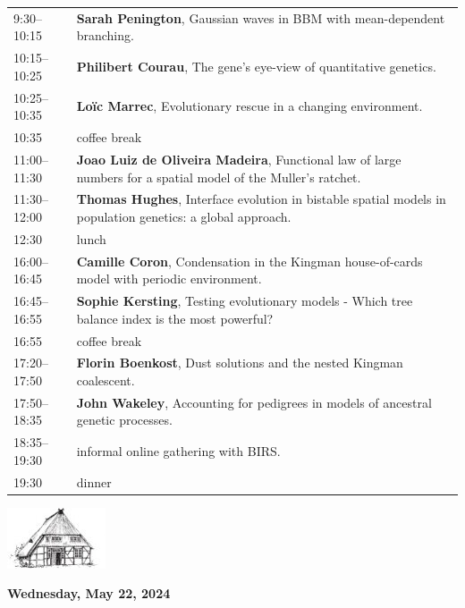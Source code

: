 \documentclass[12pt,a4paper]{article}
\newcommand{\Kopf}{%
\begin{center}%
\includegraphics[width=.2\textwidth]{logo-tsh}\\[2ex]
\end{center}
}
\begin{document}
\begin{tabular}{@{}l p{}@{}}
%
9:30--10:15 &  \textbf{Sarah Penington}, 
                Gaussian waves in BBM with mean-dependent branching. \\ 
10:15--10:25 & \textbf{Philibert Courau}, 
                The gene's eye-view of quantitative genetics. \\          
10:25--10:35 &  \textbf{Loïc Marrec},
                Evolutionary rescue in a changing environment. \\ 
10:35 & coffee break  \\  
11:00--11:30 &  \textbf{Joao Luiz de Oliveira Madeira}, 
                Functional law of large numbers for a spatial model of the Muller's ratchet. \\
11:30--12:00 &  \textbf{Thomas Hughes}, 
                Interface evolution in bistable spatial models in population genetics: a global approach.\\
12:30 & lunch  \\  
16:00--16:45 & \textbf{Camille Coron}, 
                Condensation in the Kingman house-of-cards model with periodic environment.\\ 
16:45--16:55 & \textbf{Sophie Kersting},
                Testing evolutionary models - Which tree balance index is the most powerful? \\
16:55 & coffee break  \\ 
17:20--17:50 & \textbf{Florin Boenkost}, 
                Dust solutions and the nested Kingman coalescent. \\
17:50--18:35 & \textbf{John Wakeley}, 
                Accounting for pedigrees in models of ancestral genetic processes. \\
18:35--19:30 &  informal online gathering with                     BIRS. \\
19:30 & dinner
\end{tabular}

\newpage

\Kopf
\vspace*{.75cm}

\textbf{\Large Wednesday, May 22, 2024}\medskip
\end{document}

